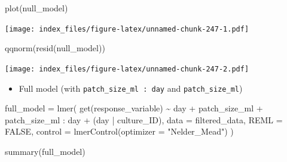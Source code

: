 \documentclass[
]{article}
\newenvironment{Shaded}{\begin{snugshade}}{\end{snugshade}}
\newcommand{\AttributeTok}[1]{\textcolor[rgb]{0.77,0.63,0.00}{#1}}
\newcommand{\ConstantTok}[1]{\textcolor[rgb]{0.00,0.00,0.00}{#1}}
\newcommand{\FunctionTok}[1]{\textcolor[rgb]{0.00,0.00,0.00}{#1}}
\newcommand{\NormalTok}[1]{#1}
\newcommand{\OtherTok}[1]{\textcolor[rgb]{0.56,0.35,0.01}{#1}}
\newcommand{\SpecialCharTok}[1]{\textcolor[rgb]{0.00,0.00,0.00}{#1}}
\newcommand{\StringTok}[1]{\textcolor[rgb]{0.31,0.60,0.02}{#1}}
\providecommand{\tightlist}{%
  \setlength{\itemsep}{0pt}\setlength{\parskip}{0pt}}
\begin{document}
\begin{Shaded}
\begin{Highlighting}[]
\FunctionTok{plot}\NormalTok{(null\_model)}
\end{Highlighting}
\end{Shaded}

\texttt{[image: index\_files/figure-latex/unnamed-chunk-247-1.pdf]}

\begin{Shaded}
\begin{Highlighting}[]
\FunctionTok{qqnorm}\NormalTok{(}\FunctionTok{resid}\NormalTok{(null\_model))}
\end{Highlighting}
\end{Shaded}

\texttt{[image: index\_files/figure-latex/unnamed-chunk-247-2.pdf]}

\begin{itemize}
\tightlist
\item
  Full model (with \texttt{patch\_size\_ml\ :\ day} and
  \texttt{patch\_size\_ml})
\end{itemize}

\begin{Shaded}
\begin{Highlighting}[]
\NormalTok{full\_model }\OtherTok{=} \FunctionTok{lmer}\NormalTok{(}
  \FunctionTok{get}\NormalTok{(response\_variable) }\SpecialCharTok{\textasciitilde{}}
\NormalTok{    day }\SpecialCharTok{+}
\NormalTok{    patch\_size\_ml }\SpecialCharTok{+}
\NormalTok{    patch\_size\_ml }\SpecialCharTok{:}\NormalTok{ day }\SpecialCharTok{+}
\NormalTok{    (day }\SpecialCharTok{|}\NormalTok{ culture\_ID),}
  \AttributeTok{data =}\NormalTok{ filtered\_data,}
  \AttributeTok{REML =} \ConstantTok{FALSE}\NormalTok{,}
  \AttributeTok{control =} \FunctionTok{lmerControl}\NormalTok{(}\AttributeTok{optimizer =} \StringTok{"Nelder\_Mead"}\NormalTok{)}
\NormalTok{)}

\FunctionTok{summary}\NormalTok{(full\_model)}
\end{Highlighting}
\end{Shaded}
\end{document}
